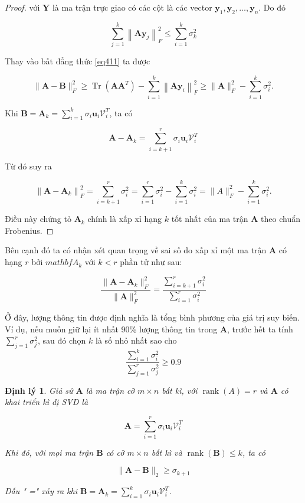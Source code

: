 \documentclass[12pt,a4paper,oneside]{report}
\newtheorem{dl}{Định lý}[section]
\numberwithin{equation}{section}
\begin{document}
\begin{proof}
với $\mathbf{Y}$ là ma trận trực giao có các cột là các vector $\mathbf{y}_{1}, \mathbf{y}_{2}, \ldots, \mathbf{y}_{n}$. Do đó

$$
\sum_{j=1}^{k}\left\|\mathbf{A y}_{j}\right\|_{F}^{2} \leqslant \sum_{i=1}^{k} \sigma_{k}^{2}
$$

Thay vào bất đẳng thức \ref{eq411} ta được

$$
\|\mathbf{A}-\mathbf{B}\|_{F}^{2} \geqslant \operatorname{Tr}\left(\mathbf{A} \mathbf{A}^{T}\right)-\sum_{i=1}^{k}\left\|\mathbf{A} \mathbf{y}_{i}\right\|_{F}^{2} \geqslant\|\mathbf{A}\|_{F}^{2}-\sum_{i=1}^{k} \sigma_{i}^{2} .
$$

Khi $\mathbf{B}=\mathbf{A}_{k}=\sum_{i=1}^{k} \sigma_{i} \mathbf{u}_{i} \mathcal{V}_{i}^{T}$, ta có

$$
\mathbf{A}-\mathbf{A}_{k}=\sum_{i=k+1}^{r} \sigma_{i} \mathbf{u}_{i} \mathcal{V}_{i}^{T}
$$

Từ đó suy ra

$$
\left\|\mathbf{A}-\mathbf{A}_{k}\right\|_{F}^{2}=\sum_{i=k+1}^{r} \sigma_{i}^{2}=\sum_{i=1}^{r} \sigma_{i}^{2}-\sum_{i=1}^{k} \sigma_{i}^{2}=\|A\|_{F}^{2}-\sum_{i=1}^{k} \sigma_{i}^{2} .
$$

Điều này chứng tỏ $\mathbf{A}_{k}$ chính là xấp xỉ hạng $k$ tốt nhất của ma trận $\mathbf{A}$ theo chuẩn Frobenius.
\end{proof}
Bên cạnh đó ta có nhận xét quan trọng về sai số do xấp xỉ một ma trận $\mathbf{A}$ có hạng $r$ bởi $mathbf{A}_{k}$ với $k < r$ phần tử như sau:

$$
	\label{eqn:26_17}
	\frac{\|\mathbf{A} - \mathbf{A}_k\|_F^2}{\|\mathbf{A}\|_F^2} = {\frac{\sum_{i=k+1}^{r} \sigma_{i}^{2}}{\sum_{i=1}^{r} \sigma_{i}^{2}}}
$$

Ở đây, {lượng thông tin} được định nghĩa
là tổng bình phương của giá trị suy biến. Ví dụ, nếu muốn giữ lại ít nhất
90\% lượng thông tin trong $\mathbf{A}$, trước hết ta tính $\sum_{j = 1}^r
\sigma_j^2$, sau đó chọn $k$ là số nhỏ nhất sao cho
$$
	\frac{\sum_{i = 1}^k \sigma_i^2}{\sum_{j = 1}^r \sigma_j^2} \geq 0.9
$$

\begin{dl}

Giả sử $\mathbf{A}$ là ma trận cỡ $m \times n$ bất kì, với $\operatorname{rank}(A)=r$ và $\mathbf{A}$ có khai triển kì dị SVD là

$$
\mathbf{A}=\sum_{i=1}^{r} \sigma_{i} \mathbf{u}_{i} \mathcal{V}_{i}^{T}
$$

Khi đó, với mọi ma trận $\mathbf{B}$ có cỡ $m \times n$ bất kì và $\operatorname{rank}(\mathbf{B}) \leqslant k$, ta có

$$
\|\mathbf{A}-\mathbf{B}\|_{2} \geqslant \sigma_{k+1}
$$

Dấu " =" xảy ra khi $\mathbf{B}=\mathbf{A}_{k}=\sum_{i=1}^{k} \sigma_{i} \mathbf{u}_{i} \mathcal{V}_{i}^{T}$.
\end{dl}
\end{document}
